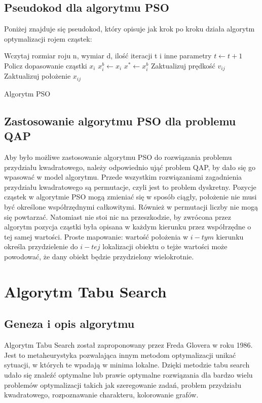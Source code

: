 \subsection{Pseudokod dla algorytmu PSO}
Poniżej znajduje się pseudokod, który opisuje jak krok po kroku działa algorytm optymalizacji rojem cząstek:
\newpage
\begin{algorithm}[H]
	Wczytaj rozmiar roju n, wymiar d, ilość iteracji t i inne parametry\;
 	{
 		$t\leftarrow t+1$\;
  		{
  			Policz dopasowanie cząstki $x_i$\;
  			{
  				$x_i^b \leftarrow x_i$
  			}
  			{
  				$x^* \leftarrow x_i^b$
  			}
  		}
  		{
  			{
  				Zaktualizuj prędkość $v_{ij}$\;
  				Zaktualizuj położenie $x_{ij}$\;
  			}
  		}
 	}
 	\caption{Algorytm PSO}
\end{algorithm}

\subsection{Zastosowanie algorytmu PSO dla problemu QAP}
Aby było możliwe zastosowanie algorytmu PSO do rozwiązania problemu przydziału kwadratowego, należy odpowiednio ująć problem QAP, by dało się go wpasować w model algorytmu. Przede wszystkim rozwiązaniami zagadnienia przydziału kwadratowego są permutacje, czyli jest to problem dyskretny. Pozycje cząstek w algorytmie PSO mogą zmieniać się w sposób ciągły, położenie nie musi być określone współrzędnymi całkowitymi. Również w permutacji liczby nie mogą się powtarzać. Natomiast nie stoi nic na przeszkodzie, by zwrócona przez algorytm pozycja cząstki była opisana w każdym kierunku przez współrzędne o tej samej wartości. Proste mapowanie: wartość położenia w $i-tym$ kierunku określa przydzielenie do $i-tej$ lokalizacji obiektu o tejże wartości może powodować, że dany obiekt będzie przydzielony wielokrotnie.
\section{Algorytm Tabu Search}
\label{sec:TS}
\subsection{Geneza i opis algorytmu}
Algorytm Tabu Search został zaproponowany przez Freda Glovera w roku 1986. Jest to metaheurystyka pozwalająca innym metodom optymalizacji unikać sytuacji, w których te wpadają w minima lokalne. Dzięki metodzie tabu search udało się znaleźć optymalne lub prawie optymalne rozwiązania dla bardzo wielu problemów optymalizacji takich jak szeregowanie zadań, problem przydziału kwadratowego, rozpoznawanie charakteru, kolorowanie grafów.

